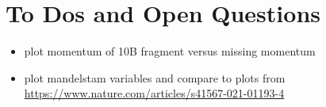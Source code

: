 \documentclass{report}
\begin{document}
\section{To Dos and Open Questions}
\begin{itemize}
\item plot momentum of 10B fragment versus missing momentum
\item plot mandelstam variables and compare to plots from \url{https://www.nature.com/articles/s41567-021-01193-4}
\end{itemize}
\end{document}

